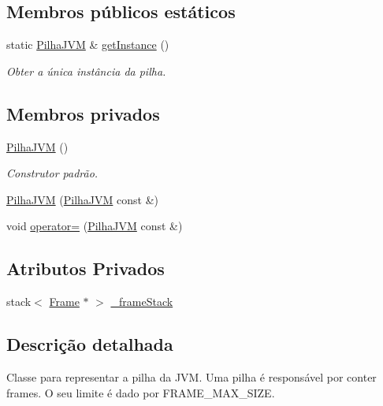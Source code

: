 \subsection*{Membros públicos estáticos}
\begin{DoxyCompactItemize}
\item 
static \hyperlink{classPilhaJVM}{Pilha\+J\+VM} \& \hyperlink{classPilhaJVM_a13bf1c43de7819ea7761616f7a04c3b9}{get\+Instance} ()
\begin{DoxyCompactList}\small\item\em Obter a única instância da pilha. \end{DoxyCompactList}\end{DoxyCompactItemize}
\subsection*{Membros privados}
\begin{DoxyCompactItemize}
\item 
\hyperlink{classPilhaJVM_a7f0451ca9cf124f5098d43928566fadf}{Pilha\+J\+VM} ()
\begin{DoxyCompactList}\small\item\em Construtor padrão. \end{DoxyCompactList}\item 
\hyperlink{classPilhaJVM_a051085f51d79d3333356c5d36bef4687}{Pilha\+J\+VM} (\hyperlink{classPilhaJVM}{Pilha\+J\+VM} const \&)
\item 
void \hyperlink{classPilhaJVM_a636c01ded057b339aa00486003db9037}{operator=} (\hyperlink{classPilhaJVM}{Pilha\+J\+VM} const \&)
\end{DoxyCompactItemize}
\subsection*{Atributos Privados}
\begin{DoxyCompactItemize}
\item 
stack$<$ \hyperlink{classFrame}{Frame} $\ast$ $>$ \hyperlink{classPilhaJVM_a09290179ef6c914aa32297ab9dae94ed}{\+\_\+frame\+Stack}
\end{DoxyCompactItemize}


\subsection{Descrição detalhada}
Classe para representar a pilha da J\+VM. Uma pilha é responsável por conter frames. O seu limite é dado por {\ttfamily F\+R\+A\+M\+E\+\_\+\+M\+A\+X\+\_\+\+S\+I\+ZE}. 

